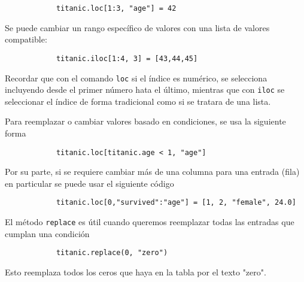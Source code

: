 \begin{verbatim}
            titanic.loc[1:3, "age"] = 42
            \end{verbatim}

\noindent Se puede cambiar un rango específico de valores con una lista de
valores compatible:

\begin{verbatim}
            titanic.iloc[1:4, 3] = [43,44,45]
            \end{verbatim}
\noindent Recordar que con el comando \texttt{loc} si el índice es numérico, se
selecciona incluyendo desde el primer número hata el último, mientras que con
\texttt{iloc} se seleccionar el índice de forma tradicional como si se tratara
de una lista.

\noindent Para reemplazar o cambiar valores basado en condiciones, se usa la
siguiente forma
\begin{verbatim}
            titanic.loc[titanic.age < 1, "age"]
            \end{verbatim}
\noindent Por su parte, si se requiere cambiar más de una columna para una
entrada (fila) en particular se puede usar el siguiente código
\begin{verbatim}
            titanic.loc[0,"survived":"age"] = [1, 2, "female", 24.0]
            \end{verbatim}

\noindent El método \texttt{replace} es útil cuando queremos reemplazar todas
las entradas que cumplan una condición
\begin{verbatim}
            titanic.replace(0, "zero")
            \end{verbatim}

\noindent Esto reemplaza todos los ceros que haya en la tabla por el texto
"zero". \\\

